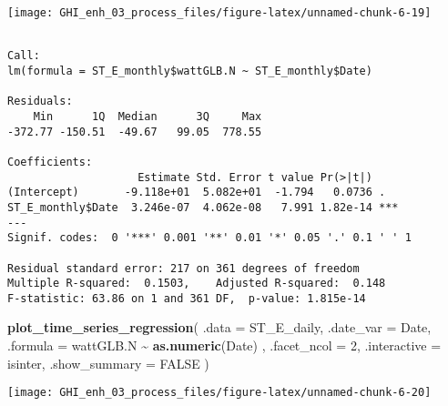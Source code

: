 \documentclass[
  10pt,
  a4paper,oneside]{article}
\newenvironment{Shaded}{\begin{snugshade}}{\end{snugshade}}
\newcommand{\AttributeTok}[1]{\textcolor[rgb]{0.13,0.29,0.53}{#1}}
\newcommand{\ConstantTok}[1]{\textcolor[rgb]{0.56,0.35,0.01}{#1}}
\newcommand{\DecValTok}[1]{\textcolor[rgb]{0.00,0.00,0.81}{#1}}
\newcommand{\FunctionTok}[1]{\textcolor[rgb]{0.13,0.29,0.53}{\textbf{#1}}}
\newcommand{\NormalTok}[1]{#1}
\newcommand{\OtherTok}[1]{\textcolor[rgb]{0.56,0.35,0.01}{#1}}
\newcommand{\SpecialCharTok}[1]{\textcolor[rgb]{0.81,0.36,0.00}{\textbf{#1}}}
\begin{document}
\begin{center}\texttt{[image: GHI\_enh\_03\_process\_files/figure-latex/unnamed-chunk-6-19]} \end{center}

\begin{Shaded}
\end{Shaded}

\begin{verbatim}

Call:
lm(formula = ST_E_monthly$wattGLB.N ~ ST_E_monthly$Date)

Residuals:
    Min      1Q  Median      3Q     Max 
-372.77 -150.51  -49.67   99.05  778.55 

Coefficients:
                    Estimate Std. Error t value Pr(>|t|)    
(Intercept)       -9.118e+01  5.082e+01  -1.794   0.0736 .  
ST_E_monthly$Date  3.246e-07  4.062e-08   7.991 1.82e-14 ***
---
Signif. codes:  0 '***' 0.001 '**' 0.01 '*' 0.05 '.' 0.1 ' ' 1

Residual standard error: 217 on 361 degrees of freedom
Multiple R-squared:  0.1503,    Adjusted R-squared:  0.148 
F-statistic: 63.86 on 1 and 361 DF,  p-value: 1.815e-14
\end{verbatim}

\begin{Shaded}
\begin{Highlighting}[]
\FunctionTok{plot\_time\_series\_regression}\NormalTok{(}
    \AttributeTok{.data         =}\NormalTok{ ST\_E\_daily,}
    \AttributeTok{.date\_var     =}\NormalTok{ Date,}
    \AttributeTok{.formula      =}\NormalTok{ wattGLB.N }\SpecialCharTok{\textasciitilde{}} \FunctionTok{as.numeric}\NormalTok{(Date)  ,}
    \AttributeTok{.facet\_ncol   =} \DecValTok{2}\NormalTok{,}
    \AttributeTok{.interactive  =}\NormalTok{ isinter,}
    \AttributeTok{.show\_summary =} \ConstantTok{FALSE}
\NormalTok{)}
\end{Highlighting}
\end{Shaded}

\begin{center}\texttt{[image: GHI\_enh\_03\_process\_files/figure-latex/unnamed-chunk-6-20]} \end{center}
\end{document}
